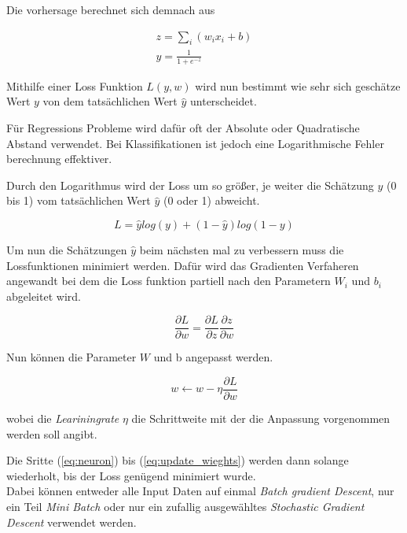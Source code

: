 Die vorhersage berechnet sich demnach aus 

\begin{align}
    \label{eq:neuron}
    z = \sum_{i}(w_{i}x_{i} + b)\\
    y = \frac{1}{1 + e^{-z}}
\end{align}

Mithilfe einer Loss Funktion $L(y,w)$ wird nun bestimmt wie sehr sich geschätze 
Wert $y$ von dem tatsächlichen Wert $\hat{y}$ unterscheidet.

Für Regressions Probleme wird dafür oft der Absolute oder Quadratische Abstand
verwendet. Bei Klassifikationen ist jedoch eine Logarithmische Fehler berechnung 
effektiver.

Durch den Logarithmus wird der Loss um so größer, je weiter die Schätzung $y$ (0 bis 1) vom 
tatsächlichen Wert $\hat{y}$ (0 oder 1) abweicht. 

\begin{equation}
    \label{eq:crossentropy}
    L = \hat{y}log(y) + (1 - \hat{y})log(1 - y)
\end{equation}


Um nun die Schätzungen $\hat{y}$ beim nächsten mal zu verbessern muss die 
Lossfunktionen minimiert werden. Dafür wird das Gradienten Verfaheren angewandt 
bei dem die Loss funktion partiell nach den Parametern $W_{i}$ und $b_{i}$ 
abgeleitet wird.

\begin{equation}
    \label{eq:grad}
    \frac{\partial L}{\partial w} = \frac{\partial L}{\partial z}\frac{\partial z}{\partial w}
\end{equation}

Nun können die Parameter $W$ und b angepasst werden.

\begin{equation}
    \label{eq:update_wieghts}
    w  \leftarrow w - \eta \frac{\partial L}{\partial w}
\end{equation}

wobei die \textit{Leariningrate} $\eta$ die Schrittweite mit der die Anpassung vorgenommen
werden soll angibt.

Die Sritte (\ref{eq:neuron}) bis (\ref{eq:update_wieghts}) werden dann solange wiederholt, 
bis der Loss genügend minimiert wurde.
\\
Dabei können entweder alle Input Daten auf einmal \textit{Batch 
gradient Descent}, nur ein Teil \textit{Mini Batch} oder nur 
ein zufallig ausgewähltes \textit{Stochastic Gradient 
Descent} verwendet werden.



